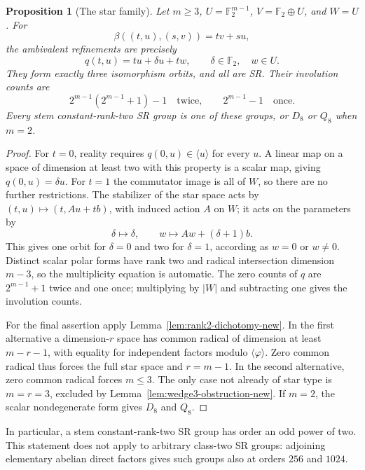 \documentclass[11pt,a4paper]{amsart}
\newtheorem{prop}[thm]{Proposition}
\theoremstyle{definition}
\theoremstyle{remark}
\numberwithin{equation}{section}
\begin{document}
\begin{prop}[The star family]\label{prop:star-new}
Let $m\ge3$, $U=\mathbb F_2^{m-1}$, $V=\mathbb F_2\oplus U$, and
$W=U$. For
\[
 \beta((t,u),(s,v))=tv+su,
\]
the ambivalent refinements are precisely
\[
 q(t,u)=tu+\delta u+tw,
 \qquad \delta\in\mathbb F_2,\quad w\in U.
\]
They form exactly three isomorphism orbits, and all are SR. Their
involution counts are
\[
 2^{m-1}(2^{m-1}+1)-1\quad\text{twice},
 \qquad 2^{m-1}-1\quad\text{once}.
\]
Every stem constant-rank-two SR group is one of these groups, or
$D_8$ or $Q_8$ when $m=2$.
\end{prop}
\begin{proof}
For $t=0$, reality requires $q(0,u)\in\langle u\rangle$ for every
$u$. A linear map on a space of dimension at least two with this
property is a scalar map, giving $q(0,u)=\delta u$. For $t=1$ the
commutator image is all of $W$, so there are no further restrictions.
The stabilizer of the star space acts by
$(t,u)\mapsto(t,Au+tb)$, with induced action $A$ on $W$; it acts
on the parameters by
\[
 \delta\mapsto\delta,
 \qquad w\mapsto Aw+(\delta+1)b.
\]
This gives one orbit for $\delta=0$ and two for $\delta=1$, according
as $w=0$ or $w\ne0$. Distinct scalar polar forms have rank two and
radical intersection dimension $m-3$, so the multiplicity equation
is automatic. The zero counts of $q$ are $2^{m-1}+1$ twice and one
once; multiplying by $|W|$ and subtracting one gives the involution
counts.

For the final assertion apply Lemma~\ref{lem:rank2-dichotomy-new}.
In the first alternative a dimension-$r$ space has common radical
of dimension at least $m-r-1$, with equality for independent
factors modulo $\langle\varphi\rangle$. Zero common radical thus
forces the full star space and $r=m-1$. In the second alternative,
zero common radical forces $m\le3$. The only case not already
of star type is $m=r=3$, excluded by
Lemma~\ref{lem:wedge3-obstruction-new}. If $m=2$, the scalar
nondegenerate form gives $D_8$ and $Q_8$.
\end{proof}

In particular, a stem constant-rank-two SR group has order an odd
power of two. This statement does not apply to arbitrary class-two
SR groups: adjoining elementary abelian direct factors gives such
groups also at orders $256$ and $1024$.
\end{document}
